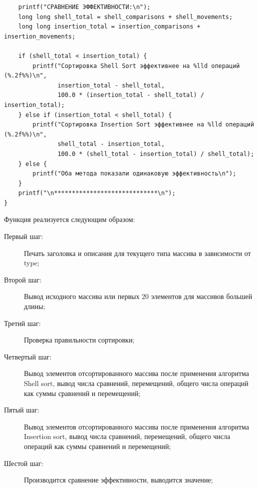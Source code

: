 \documentclass[a4paper,12pt,titlepage,finall]{article}
\begin{document}
\begin{verbatim}
    printf("СРАВНЕНИЕ ЭФФЕКТИВНОСТИ:\n");
    long long shell_total = shell_comparisons + shell_movements;
    long long insertion_total = insertion_comparisons + insertion_movements;
    
    if (shell_total < insertion_total) {
        printf("Сортировка Shell Sort эффективнее на %lld операций (%.2f%%)\n", 
               insertion_total - shell_total, 
               100.0 * (insertion_total - shell_total) / insertion_total);
    } else if (insertion_total < shell_total) {
        printf("Сортировка Insertion Sort эффективнее на %lld операций (%.2f%%)\n", 
               shell_total - insertion_total,
               100.0 * (shell_total - insertion_total) / shell_total);
    } else {
        printf("Оба метода показали одинаковую эффективность\n");
    }
    printf("\n*****************************\n");
}
\end{verbatim}

Функция реализуется следующим образом:

\begin{description}
\item[Первый шаг:] Печать заголовка и описания для текущего типа массива в зависимости от type;

\item[Второй шаг:] Вывод исходного массива или первых 20 элементов для массивов большей длины;

\item[Третий шаг:] Проверка правильности сортировки;

\item[Четвертый шаг:] Вывод элементов отсортированного массива после применения алгоритма Shell sort, вывод числа сравнений, перемещений, общего числа операций как суммы сравнений и перемещений;

\item[Пятый шаг:] Вывод элементов отсортированного массива после применения алгоритма Insertion sort, вывод числа сравнений, перемещений, общего числа операций как суммы сравнений и перемещений;

\item[Шестой шаг:] Производится сравнение эффективности, выводится значение;

\end{description}


\newpage
\end{document}
